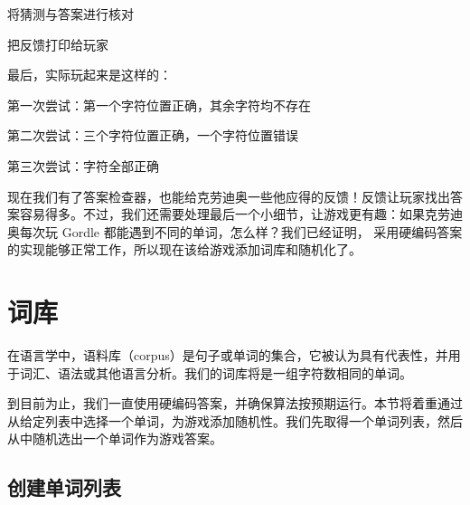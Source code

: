 \begin{codeannotations}
\item 将猜测与答案进行核对
\item 把反馈打印给玩家
\end{codeannotations}

最后，实际玩起来是这样的：


\begin{codeannotations}
\item 第一次尝试：第一个字符位置正确，其余字符均不存在
\item 第二次尝试：三个字符位置正确，一个字符位置错误
\item 第三次尝试：字符全部正确
\end{codeannotations}

现在我们有了答案检查器，也能给克劳迪奥一些他应得的反馈！反馈让玩家找出答案容易得多。不过，我们还需要处理最后一个小细节，让游戏更有趣：如果克劳迪奥每次玩 Gordle 都能遇到不同的单词，怎么样？我们已经证明，
采用硬编码答案的实现能够正常工作，所以现在该给游戏添加词库和随机化了。

\section{词库}

在语言学中，语料库（corpus）是句子或单词的集合，它被认为具有代表性，并用于词汇、语法或其他语言分析。我们的词库将是一组字符数相同的单词。

到目前为止，我们一直使用硬编码答案，并确保算法按预期运行。本节将着重通过从给定列表中选择一个单词，为游戏添加随机性。我们先取得一个单词列表，然后从中随机选出一个单词作为游戏答案。

\subsection{创建单词列表}

